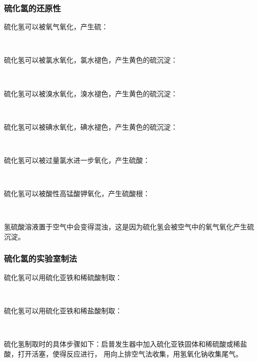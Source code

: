 \documentclass[UTF8]{ctexart}
\begin{document}
\subsubsection{硫化氢的还原性}
    硫化氢可以被氧气氧化，产生硫：
    \begin{center}
        \\[4mm]
    \end{center}
    硫化氢可以被氯水氧化，氯水褪色，产生黄色的硫沉淀：
    \begin{center}
        \\[4mm]
    \end{center}
    硫化氢可以被溴水氧化，溴水褪色，产生黄色的硫沉淀：
    \begin{center}
        \\[4mm]
    \end{center}
    硫化氢可以被碘水氧化，碘水褪色，产生黄色的硫沉淀：
    \begin{center}
        \\[4mm]
    \end{center}
    硫化氢可以被过量氯水进一步氧化，产生硫酸：
    \begin{center}
        \\[4mm]
    \end{center}
    硫化氢可以被酸性高锰酸钾氧化，产生硫酸根：
    \begin{center}
        \\[4mm]
    \end{center}
    氢硫酸溶液置于空气中会变得混浊，这是因为硫化氢会被空气中的氧气氧化产生硫沉淀。

\newpage

\subsubsection{硫化氢的实验室制法}
    硫化氢可以用硫化亚铁和稀硫酸制取：
    \begin{center}
        \\[6mm]
    \end{center}
    硫化氢可以用硫化亚铁和稀盐酸制取：
    \begin{center}
        \\[6mm]
    \end{center}
    硫化氢制取时的具体步骤如下：启普发生器中加入硫化亚铁固体和稀硫酸或稀盐酸，打开活塞，使得反应进行，
    用向上排空气法收集，用氢氧化钠收集尾气。\\
\end{document}
